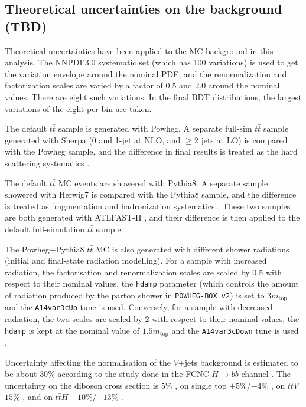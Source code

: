 \subsection{Theoretical uncertainties on the background (TBD)}

Theoretical uncertainties have been applied to the MC background in this analysis. The NNPDF3.0 systematic set (which has 100 variations) is used to get the variation envelope around the nominal PDF, and the renormalization and factorization scales are varied by a factor of 0.5 and 2.0 around the nominal values. There are eight such variations. In the final BDT distributions, the largest variations of the eight per bin are taken.

The default $t\bar{t}$ sample is generated with Powheg. A separate full-sim $t\bar{t}$ sample generated with Sherpa (0 and 1-jet at NLO, and $\ge$2 jets at LO) is compared with the Powheg sample, and the difference in final results is treated as the hard scattering systematics \cite{ttbarSys}.

The default $t\bar{t}$ MC events are showered with Pythia8. A separate sample showered with Herwig7 is compared with the Pythia8 sample, and the difference is treated as fragmentation and hadronization systematics \cite{ttbarSys}. These two samples are both generated with ATLFAST-II \cite{AFII}, and their difference is then applied to the default full-simulation $t\bar{t}$ sample.

The Powheg+Pythia8 $t\bar{t}$ MC is also generated with different shower radiations (initial and final-state radiation modelling). For a sample with increased radiation, the factorisation and renormalization scales are scaled by 0.5 with respect to their nominal values, the \texttt{hdamp} parameter (which controls the amount of radiation produced by the parton shower in \texttt{POWHEG-BOX v2}) is set to $3 m_{\text{top}}$ and the \texttt{A14var3cUp} tune is used. Conversely, for a sample with decreased radiation, the two scales are scaled by 2 with respect to their nominal values, the \texttt{hdamp} is kept at the nominal value of $1.5 m_{\text{top}}$ and the \texttt{A14var3cDown} tune is used \cite{ttbarSys}.

Uncertainty affecting the normalisation of the $V$+jets background is estimated to be about $30\%$ according to the study done in the FCNC $H\to b\bar{b}$ channel \cite{FCNC_Hbb}. The uncertainty on the diboson cross section is $5\%$ \cite{VV_uncert}, on single top $+5\%$/$-4\%$ \cite{WtXsec}\cite{st_uncert_1,st_uncert_2}, on $t\bar{t}V$ $15\%$ \cite{ttV_uncert_1,ttV_uncert_2}, and on $t\bar{t}H$ $+10\%$/$-13\%$ \cite{ttH_uncert}.

